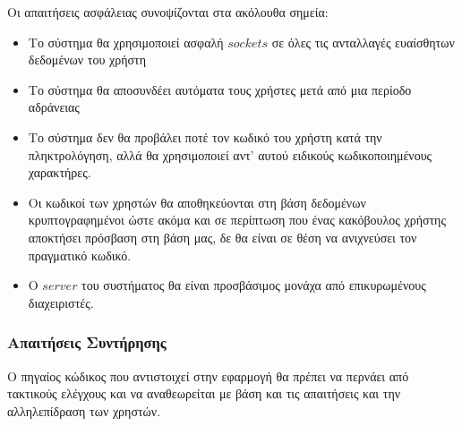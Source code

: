 \documentclass[12pt]{article}
\begin{document}
Οι απαιτήσεις ασφάλειας συνοψίζονται στα ακόλουθα σημεία:

\begin{itemize}
\item Το σύστημα θα χρησιμοποιεί ασφαλή $sockets$ σε όλες τις ανταλλαγές ευαίσθητων δεδομένων του χρήστη
\item Το σύστημα θα αποσυνδέει αυτόματα τους χρήστες μετά από μια περίοδο αδράνειας

\item Το σύστημα δεν θα προβάλει ποτέ τον κωδικό του χρήστη κατά την πληκτρολόγηση, αλλά θα χρησιμοποιεί αντ' αυτού ειδικούς κωδικοποιημένους χαρακτήρες.
\item Οι κωδικοί των χρηστών θα αποθηκεύονται στη βάση δεδομένων κρυπτογραφημένοι ώστε ακόμα και σε περίπτωση που ένας κακόβουλος χρήστης αποκτήσει πρόσβαση στη βάση μας, δε θα είναι σε θέση να ανιχνεύσει τον πραγματικό κωδικό.
\item Ο $server$ του συστήματος θα είναι προσβάσιμος μονάχα από επικυρωμένους διαχειριστές.
\end{itemize}

\subsubsection{Απαιτήσεις Συντήρησης}

Ο πηγαίος κώδικος που αντιστοιχεί στην εφαρμογή θα πρέπει να περνάει από τακτικούς ελέγχους και να αναθεωρείται με βάση και τις απαιτήσεις και την αλληλεπίδραση των χρηστών.
\end{document}
